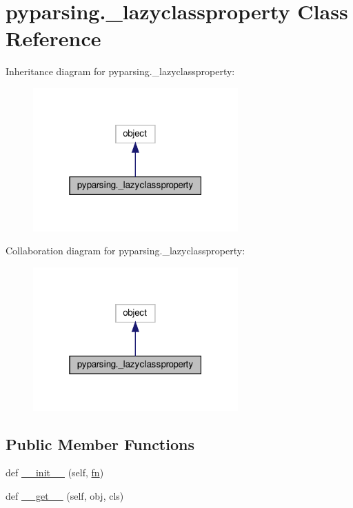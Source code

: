 \hypertarget{classpyparsing_1_1__lazyclassproperty}{}\section{pyparsing.\+\_\+lazyclassproperty Class Reference}
\label{classpyparsing_1_1__lazyclassproperty}


Inheritance diagram for pyparsing.\+\_\+lazyclassproperty\+:
\nopagebreak
\begin{figure}[H]
\begin{center}
\leavevmode
\includegraphics[width=223pt]{classpyparsing_1_1__lazyclassproperty__inherit__graph}
\end{center}
\end{figure}


Collaboration diagram for pyparsing.\+\_\+lazyclassproperty\+:
\nopagebreak
\begin{figure}[H]
\begin{center}
\leavevmode
\includegraphics[width=223pt]{classpyparsing_1_1__lazyclassproperty__coll__graph}
\end{center}
\end{figure}
\subsection*{Public Member Functions}
\begin{DoxyCompactItemize}
\item 
def \hyperlink{classpyparsing_1_1__lazyclassproperty_a863cabf13208a70619f135c0e08a395f}{\+\_\+\+\_\+init\+\_\+\+\_\+} (self, \hyperlink{classpyparsing_1_1__lazyclassproperty_af8ec3b1a829489fad550c8b9ba066f90}{fn})
\item 
def \hyperlink{classpyparsing_1_1__lazyclassproperty_aec562d4948d7d837036d203d03a7aec2}{\+\_\+\+\_\+get\+\_\+\+\_\+} (self, obj, cls)
\end{DoxyCompactItemize}
